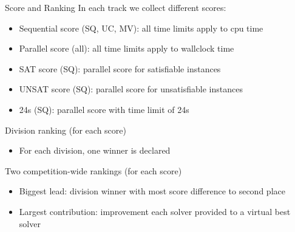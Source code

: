 \documentclass[table]{beamer}
\def\emph#1{\textcolor{MYblue}{#1}}
\begin{document}
\begin{frame}{Score and Ranking}
  In each track we collect different scores:
  \begin{itemize}
  \item \emph{Sequential score} (SQ, UC, MV): all time limits apply to cpu time
  \item \emph{Parallel score} (all): all time limits apply to wallclock time
  \item \emph{SAT score} (SQ): parallel score for \emph{satisfiable} instances
  \item \emph{UNSAT score} (SQ): parallel score for \emph{unsatisfiable} instances
  \item \emph{24s} (SQ): parallel score with time limit of \emph{24s}
  \end{itemize}
  \bigskip

  Division ranking (for each score)
  \begin{itemize}
  \item For each division, one winner is declared
  \end{itemize}

  \bigskip

  Two competition-wide rankings (for each score)
  \begin{itemize}
  \item \emph{Biggest lead}: division winner with most score difference to second place
  \item \emph{Largest contribution}: improvement each solver provided to a virtual best solver
  \end{itemize}

\end{frame}
\end{document}
